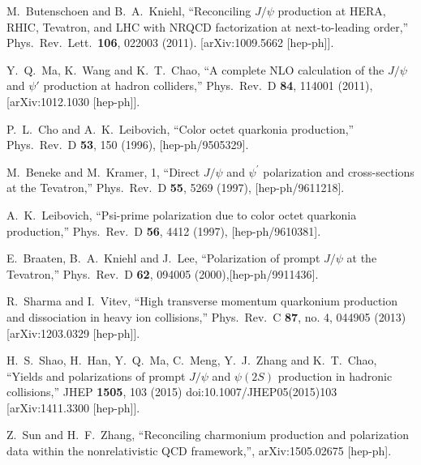 \documentclass[aps,prc,preprint,superscriptaddress,showpacs,showkeys,amsmath]{revtex4-1}
\begin{document}
\noindent
\begin{thebibliography}{100}
\medskip

  M.~Butenschoen and B.~A.~Kniehl,
  ``Reconciling $J/\psi$ production at HERA, RHIC, Tevatron, and LHC with NRQCD factorization at next-to-leading order,''
  Phys.\ Rev.\ Lett.\  {\bf 106}, 022003 (2011). 
[arXiv:1009.5662 [hep-ph]].
 

  Y.~Q.~Ma, K.~Wang and K.~T.~Chao,
  ``A complete NLO calculation of the $J/\psi$ and $\psi'$ production at hadron colliders,''
  Phys.\ Rev.\ D {\bf 84}, 114001 (2011),
  [arXiv:1012.1030 [hep-ph]].


  P.~L.~Cho and A.~K.~Leibovich,
  ``Color octet quarkonia production,''
  Phys.\ Rev.\ D {\bf 53}, 150 (1996),
  [hep-ph/9505329].

  M.~Beneke and M.~Kramer, 1,
  ``Direct $J/\psi$ and $\psi^\prime$ polarization and cross-sections at the Tevatron,''
  Phys.\ Rev.\ D {\bf 55}, 5269 (1997), [hep-ph/9611218].

  A.~K.~Leibovich,
  ``Psi-prime polarization due to color octet quarkonia production,''
  Phys.\ Rev.\ D {\bf 56}, 4412 (1997), [hep-ph/9610381].

  E.~Braaten, B.~A.~Kniehl and J.~Lee,
  ``Polarization of prompt $J/\psi$ at the Tevatron,''
  Phys.\ Rev.\ D {\bf 62}, 094005 (2000),[hep-ph/9911436].

  R.~Sharma and I.~Vitev,
  ``High transverse momentum quarkonium production and dissociation in heavy ion collisions,''
  Phys.\ Rev.\ C {\bf 87}, no. 4, 044905 (2013)
  [arXiv:1203.0329 [hep-ph]].


  H.~S.~Shao, H.~Han, Y.~Q.~Ma, C.~Meng, Y.~J.~Zhang and K.~T.~Chao,
  ``Yields and polarizations of prompt $J/\psi$ and $\psi(2S)$ production in hadronic collisions,''
  JHEP {\bf 1505}, 103 (2015)
  doi:10.1007/JHEP05(2015)103
  [arXiv:1411.3300 [hep-ph]].


  Z.~Sun and H.~F.~Zhang,
  ``Reconciling charmonium production and polarization data within the nonrelativistic QCD framework,'',
  arXiv:1505.02675 [hep-ph].



\end{thebibliography}
\end{document}

